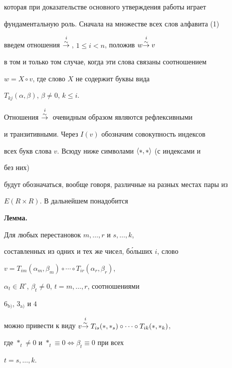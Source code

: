 которая при доказательстве основного утверждения работы играет 


фундаментальную роль. Сначала на множестве всех слов алфавита (1) 


введем отношения $\overset{i\;}{{\overset{\sim}{\to}{}}}{}$, $1\le i<n$, положив $w\overset{i\;}{{\overset{\sim}{\to}{}}}{} v$ 


в том и только том случае, когда эти слова связаны соотношением 


$w=X\circ v$, где слово $X$ не содержит буквы вида 


$T_{kj}(\alpha,\beta)$, $\beta\ne0$, $k\le i$. 


Отношения $\overset{i\;}{{\overset{\sim}{\to}{}}}{}$ очевидным образом являются рефлексивными 


и транзитивными. Через $I(v)$ обозначим совокупность индексов 


всех букв слова $v$. Всюду ниже символами $\langle*,*\rangle$ (с индексами и 


без них) 


будут обозначаться, вообще говоря, различные на разных местах пары из 


$E(R\times R)$. В дальнейшем понадобится 


\medskip 


 


{\bf Лемма.}{\it 


Для любых перестановок $m,\dotsc,r$ и $s,\dotsc,k$, 


составленных из одних и тех же чисел, б\'ольших $i$, слово 


$v=T_{im}(\alpha_m,\beta_m)\circ\dotsb\circ T_{ir}(\alpha_r,\beta_r)$, 


$\alpha_t\in R^\circ$, $\beta_t\ne0$, $t=m,\dotsc,r$, соотношениями 


$6_{\mathrm b)}$, $3_{\mathrm a)}$ и $4$ 


можно привести к виду $v\isimto T_{is}(*,*_s)\circ\dotsb\circ 


T_{ik}(*,*_k)$, 


где $*_t\ne0$ и $*_t\equiv0\Leftrightarrow\beta_t\equiv0$ при всех 


$t=s,\dotsc,k$. 


} 


 



